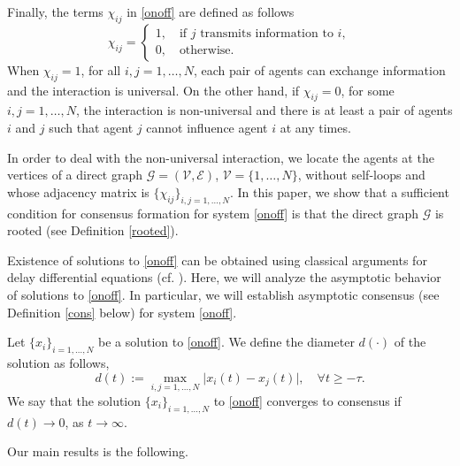 \documentclass[11pt]{article}
\begin{document}
	Finally, the terms $\chi_{ij}$ in \eqref{onoff} are defined as follows
    \begin{equation}\label{chiij}
    	{\chi_{ij}=}\begin{cases}
    		1,\quad \text{if } j \text{ transmits information to } i,\\
    		0,\quad \text{otherwise}.
    	\end{cases}
    \end{equation}
    When $\chi_{ij}=1$, for all $i,j=1,\dots,N$, each pair of agents can exchange information and the interaction is universal. On the other hand, if $\chi_{ij}=0$, for some $i,j=1,\dots,N$, the interaction is non-universal and there is at least a pair of agents $i$ and $j$ such that agent $j$ cannot influence agent $i$ at any times. 
    
    In order to deal with the non-universal interaction, we locate the agents at the vertices of a direct graph $\mathcal{G}=(\mathcal{V},\mathcal{E})$, $\mathcal{V}=\{1,\dots,N\}$, without self-loops and whose adjacency matrix is $\{\chi_{ij}\}_{i,j=1,\dots,N}$. In this paper, we show that a sufficient condition for consensus formation for system \eqref{onoff} is that the direct graph $\mathcal{G}$ is rooted (see Definition \ref{rooted}).

	\vspace{0.1cm}

Existence of solutions to \eqref{onoff} can be obtained using classical arguments for delay differential equations (cf. \cite{HL, Halanay}). Here, we will analyze the asymptotic behavior of solutions to \eqref{onoff}. In particular, we will establish asymptotic consensus (see Definition \ref{cons} below) for system \eqref{onoff}.

\begin{defn}[Consensus]\label{cons}
	Let $\{x_{i}\}_{i=1,\dots,N}$ be a solution to \eqref{onoff}. We define the diameter $d(\cdot)$ of the solution as follows,
	\begin{equation}\label{diamhk}
		d(t):=\max_{i,j=1,\dots,N}\lvert x_{i}(t)-x_{j}(t)\rvert,\quad \forall t\geq -\tau.
	\end{equation} 
	We say that the solution $\{x_{i}\}_{i=1,\dots,N}$ to \eqref{onoff} converges to consensus if $d(t)\to0$, as $t\to \infty$.
\end{defn}
Our main results is the following. 
\end{document}

